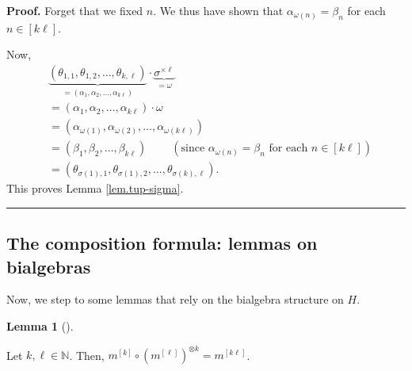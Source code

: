 \documentclass[numbers=enddot,12pt,final,onecolumn,notitlepage]{scrartcl}%
\theoremstyle{definition}
\newtheorem{lem}[theo]{Lemma}
\newenvironment{lemma}[1][]
{\begin{lem}[#1]\begin{leftbar}}
{\end{leftbar}\end{lem}}
\newenvironment{proof}[1][Proof]{\noindent\textbf{#1.} }{\ \rule{0.5em}{0.5em}}
\begin{document}
\begin{proof}
Forget that we fixed $n$. We thus have shown that $\alpha_{\omega\left(
n\right)  }=\beta_{n}$ for each $n\in\left[  k\ell\right]  $.

Now,
\begin{align*}
&  \underbrace{\left(  \theta_{1,1},\theta_{1,2},\ldots,\theta_{k,\ell
}\right)  }_{=\left(  \alpha_{1},\alpha_{2},\ldots,\alpha_{k\ell}\right)
}\cdot\underbrace{\sigma^{\times\ell}}_{=\omega}\\
&  =\left(  \alpha_{1},\alpha_{2},\ldots,\alpha_{k\ell}\right)  \cdot\omega\\
&  =\left(  \alpha_{\omega\left(  1\right)  },\alpha_{\omega\left(  2\right)
},\ldots,\alpha_{\omega\left(  k\ell\right)  }\right) \\
&  =\left(  \beta_{1},\beta_{2},\ldots,\beta_{k\ell}\right)
\ \ \ \ \ \ \ \ \ \ \left(  \text{since }\alpha_{\omega\left(  n\right)
}=\beta_{n}\text{ for each }n\in\left[  k\ell\right]  \right) \\
&  =\left(  \theta_{\sigma\left(  1\right)  ,1},\theta_{\sigma\left(
1\right)  ,2},\ldots,\theta_{\sigma\left(  k\right)  ,\ell}\right)  .
\end{align*}
This proves Lemma \ref{lem.tup-sigma}.
\end{proof}

\subsection{The composition formula: lemmas on bialgebras}

Now, we step to some lemmas that rely on the bialgebra structure on $H$.

\begin{lemma}
\label{lem.mmm}Let $k,\ell\in\mathbb{N}$. Then, $m^{\left[  k\right]  }%
\circ\left(  m^{\left[  \ell\right]  }\right)  ^{\otimes k}=m^{\left[
k\ell\right]  }$.
\end{lemma}
\end{document}
